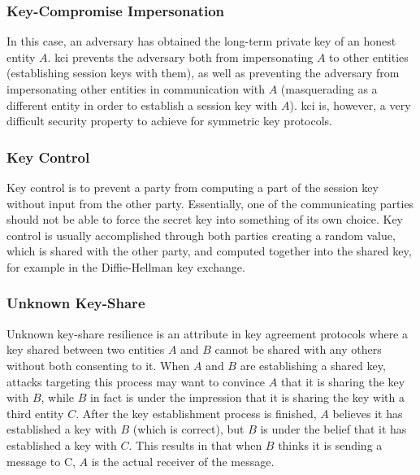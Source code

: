 \subsubsection{Key-Compromise Impersonation}

In this case, an adversary has obtained the long-term private key of an honest entity $A$. \gls{kci} prevents the adversary both from impersonating $A$ to other entities (establishing session keys with them), as well as preventing the adversary from impersonating other entities in communication with $A$ (masquerading as a different entity in order to establish a session key with $A$). \gls{kci} is, however, a very difficult security property to achieve for symmetric key protocols.




\subsubsection{Key Control}

Key control is to prevent a party from computing a part of the session key without input from the other party. Essentially, one of the communicating parties should not be able to force the secret key into something of its own choice. Key control is usually accomplished through both parties creating a random value, which is shared with the other party, and computed together into the shared key, for example in the Diffie-Hellman key exchange.

\subsubsection{Unknown Key-Share}

Unknown key-share resilience is an attribute in key agreement protocols where a key shared between two entities $A$ and $B$ cannot be shared with any others without both consenting to it. When $A$ and $B$ are establishing a shared key, attacks targeting this process may want to convince $A$ that it is sharing the key with $B$, while $B$ in fact is under the impression that it is sharing the key with a third entity $C$. After the key establishment process is finished, $A$ believes it has established a key with $B$ (which is correct), but $B$ is under the belief that it has established a key with $C$. This results in that when $B$ thinks it is sending a message to C, $A$ is the actual receiver of the message.



